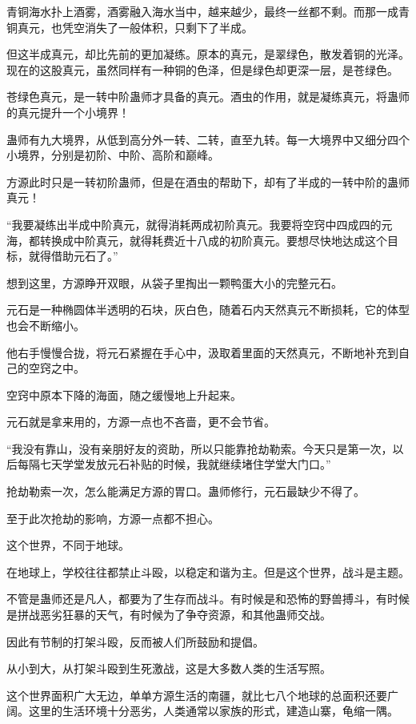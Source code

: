 \begin{this_body}
青铜海水扑上酒雾，酒雾融入海水当中，越来越少，最终一丝都不剩。而那一成青铜真元，也凭空消失了一般体积，只剩下了半成。

但这半成真元，却比先前的更加凝练。原本的真元，是翠绿色，散发着铜的光泽。现在的这股真元，虽然同样有一种铜的色泽，但是绿色却更深一层，是苍绿色。

苍绿色真元，是一转中阶蛊师才具备的真元。酒虫的作用，就是凝练真元，将蛊师的真元提升一个小境界！

蛊师有九大境界，从低到高分外一转、二转，直至九转。每一大境界中又细分四个小境界，分别是初阶、中阶、高阶和巅峰。

方源此时只是一转初阶蛊师，但是在酒虫的帮助下，却有了半成的一转中阶的蛊师真元！

“我要凝练出半成中阶真元，就得消耗两成初阶真元。我要将空窍中四成四的元海，都转换成中阶真元，就得耗费近十八成的初阶真元。要想尽快地达成这个目标，就得借助元石了。”

想到这里，方源睁开双眼，从袋子里掏出一颗鸭蛋大小的完整元石。

元石是一种椭圆体半透明的石块，灰白色，随着石内天然真元不断损耗，它的体型也会不断缩小。

他右手慢慢合拢，将元石紧握在手心中，汲取着里面的天然真元，不断地补充到自己的空窍之中。

空窍中原本下降的海面，随之缓慢地上升起来。

元石就是拿来用的，方源一点也不吝啬，更不会节省。

“我没有靠山，没有亲朋好友的资助，所以只能靠抢劫勒索。今天只是第一次，以后每隔七天学堂发放元石补贴的时候，我就继续堵住学堂大门口。”

抢劫勒索一次，怎么能满足方源的胃口。蛊师修行，元石最缺少不得了。

至于此次抢劫的影响，方源一点都不担心。

这个世界，不同于地球。

在地球上，学校往往都禁止斗殴，以稳定和谐为主。但是这个世界，战斗是主题。

不管是蛊师还是凡人，都要为了生存而战斗。有时候是和恐怖的野兽搏斗，有时候是拼战恶劣狂暴的天气，有时候为了争夺资源，和其他蛊师交战。

因此有节制的打架斗殴，反而被人们所鼓励和提倡。

从小到大，从打架斗殴到生死激战，这是大多数人类的生活写照。

这个世界面积广大无边，单单方源生活的南疆，就比七八个地球的总面积还要广阔。这里的生活环境十分恶劣，人类通常以家族的形式，建造山寨，龟缩一隅。


\end{this_body}
